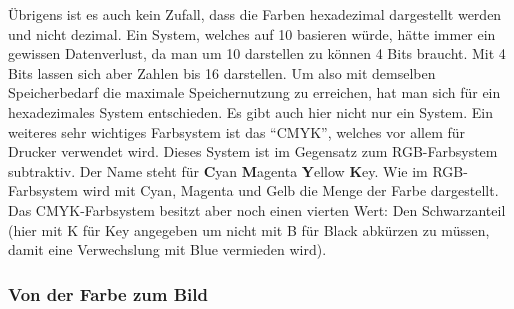 Übrigens ist es auch kein Zufall, dass die Farben hexadezimal dargestellt werden und nicht dezimal. Ein System, welches auf 10 basieren würde, hätte immer ein gewissen Datenverlust, da man um 10 darstellen zu können 4 Bits braucht. Mit 4 Bits lassen sich aber Zahlen bis 16 darstellen. Um also mit demselben Speicherbedarf die maximale Speichernutzung zu erreichen, hat man sich für ein hexadezimales System entschieden. Es gibt auch hier nicht nur ein System. Ein weiteres sehr wichtiges Farbsystem ist das "`CMYK"', welches vor allem für Drucker verwendet wird. Dieses System ist im Gegensatz zum RGB-Farbsystem subtraktiv. Der Name steht für \textbf{C}yan \textbf{M}agenta \textbf{Y}ellow \textbf{K}ey. Wie im RGB-Farbsystem wird mit Cyan, Magenta und Gelb die Menge der Farbe dargestellt. Das CMYK-Farbsystem besitzt aber noch einen vierten Wert: Den Schwarzanteil (hier mit K für Key angegeben um nicht mit B für Black abkürzen zu müssen, damit eine Verwechslung mit Blue vermieden wird).


\subsubsection{Von der Farbe zum Bild}



